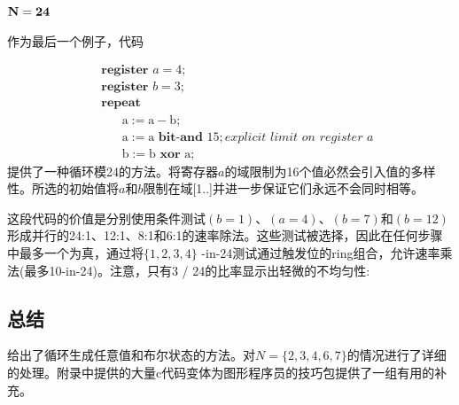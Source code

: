 \begin{CJK}{UTF8}{gbsn}
\subsection*{$\bf{
N=24
}$}

作为最后一个例子，代码

$$
\begin{aligned}
&\textbf { register } a=4 ; \\
&\textbf { register } b=3 ; \\
&\textbf { repeat }\\
&\qquad \mathrm{a}:=\mathrm{a}-\mathrm{b};\\
&\qquad \mathrm{a}:=\mathrm{a} \textbf{ bit-and } 15; \textit{explicit limit on register a}\\
&\qquad \mathrm{b}:=\mathrm{b} \textbf{ xor } \mathrm{a} ;
\end{aligned}
$$
提供了一种循环模24的方法。将寄存器$a$的域限制为16个值必然会引入值的多样性。所选的初始值将$a$和$b$限制在域[1..]并进一步保证它们永远不会同时相等。

这段代码的价值是分别使用条件测试$(b=1)、(a=4)、(b=7)$和$(b=12)$形成并行的24:1、12:1、8:1和6:1的速率除法。这些测试被选择，因此在任何步骤中最多一个为真，通过将$\{1,2,3,4\}$ -in-24测试通过触发位的ring组合，允许速率乘法(最多10-in-24)。注意，只有3 / 24的比率显示出轻微的不均匀性:

\begin{table}
\end{table}
\subsection*{总结}
给出了循环生成任意值和布尔状态的方法。对$N=\{2,3,4,6,7\}$的情况进行了详细的处理。附录中提供的大量c代码变体为图形程序员的技巧包提供了一组有用的补充。


\end{CJK}
